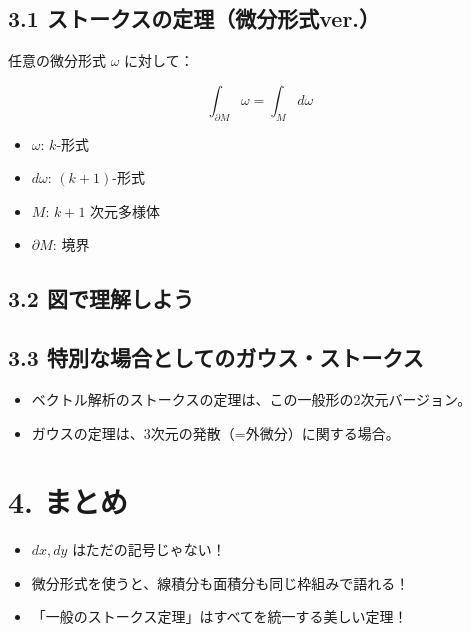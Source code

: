 \documentclass[a4j,11pt]{jsarticle}
\begin{document}
\subsection*{3.1 ストークスの定理（微分形式ver.）}
任意の微分形式 $\omega$ に対して：

\[
\int_{\partial M} \omega = \int_M d\omega
\]

\begin{itemize}
  \item $\omega$: $k$-形式
  \item $d\omega$: $(k+1)$-形式
  \item $M$: $k+1$ 次元多様体
  \item $\partial M$: 境界
\end{itemize}

\subsection*{3.2 図で理解しよう}

\begin{center}
\end{center}

\subsection*{3.3 特別な場合としてのガウス・ストークス}
\begin{itemize}
  \item ベクトル解析のストークスの定理は、この一般形の2次元バージョン。
  \item ガウスの定理は、3次元の発散（=外微分）に関する場合。
\end{itemize}

\section*{4. まとめ}

\begin{itemize}
  \item $dx, dy$ はただの記号じゃない！
  \item 微分形式を使うと、線積分も面積分も同じ枠組みで語れる！
  \item 「一般のストークス定理」はすべてを統一する美しい定理！
\end{itemize}
\end{document}
